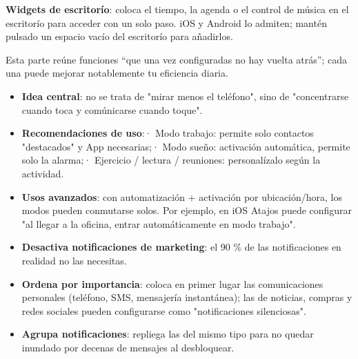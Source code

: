 \textbf{Widgets de escritorío}: coloca el tiempo, la agenda o el control de música en el escritorío para acceder con un solo paso. iOS y Android lo admiten; mantén pulsado un espacio vacío del escritorío para añadirlos.


Esta parte reúne funciones “que una vez configuradas no hay vuelta atrás”; cada una puede mejorar notablemente tu eficiencia diaria.


\begin{itemize}
  \item \textbf{Idea central}: no se trata de "mirar menos el teléfono", sino de "concentrarse cuando toca y comúnicarse cuando toque".
  \item \textbf{Recomendaciones de uso}:\newline · Modo trabajo: permite solo contactos "destacados" y App necesarias;\newline · Modo sueño: activación automática, permite solo la alarma;\newline · Ejercicio / lectura / reuniones: personalízalo según la actividad.
  \item \textbf{Usos avanzados}: con automatización + activación por ubicación/hora, los modos pueden conmutarse solos. Por ejemplo, en iOS Atajos puede configurar "al llegar a la oficina, entrar automáticamente en modo trabajo".
\end{itemize}


\begin{itemize}
  \item \textbf{Desactiva notificaciones de marketing}: el 90 \% de las notificaciones en realidad no las necesitas.
  \item \textbf{Ordena por importancia}: coloca en primer lugar las comunicaciones personales (teléfono, SMS, mensajería instantánea); las de noticias, compras y redes sociales pueden configurarse como "notificaciones silenciosas".
  \item \textbf{Agrupa notificaciones}: repliega las del mismo tipo para no quedar inundado por decenas de mensajes al desbloquear.
\end{itemize}

